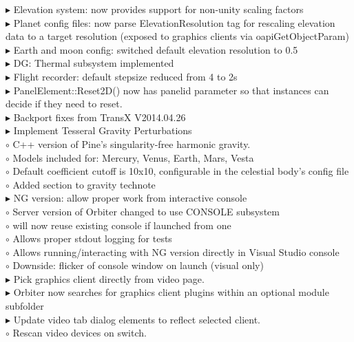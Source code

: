 \documentclass[Orbiter User Manual.tex]{subfiles}
\begin{document}
\begin{sloppypar}
$\blacktriangleright$ Elevation system: now provides support for non-unity scaling factors\\
$\blacktriangleright$ Planet config files: now parse ElevationResolution tag for rescaling elevation data to a target resolution (exposed to graphics clients via oapiGetObjectParam)\\
$\blacktriangleright$ Earth and moon config: switched default elevation resolution to 0.5\\
$\blacktriangleright$ DG: Thermal subsystem implemented\\
$\blacktriangleright$ Flight recorder: default stepsize reduced from 4 to 2s\\
$\blacktriangleright$ PanelElement::Reset2D() now has panelid parameter so that instances can decide if they need to reset.\\
$\blacktriangleright$ Backport fixes from TransX V2014.04.26\\
$\blacktriangleright$ Implement Tesseral Gravity Perturbations\\
$\circ$ C++ version of Pine's singularity-free harmonic gravity.\\
$\circ$ Models included for: Mercury, Venus, Earth, Mars, Vesta\\
$\circ$ Default coefficient cutoff is 10x10, configurable in the celestial body's config file\\
$\circ$ Added section to gravity technote\\
$\blacktriangleright$ NG version: allow proper work from interactive console\\
$\circ$ Server version of Orbiter changed to use CONSOLE subsystem\\
$\circ$ will now reuse existing console if launched from one\\
$\circ$ Allows proper stdout logging for tests\\
$\circ$ Allows running/interacting with NG version directly in Visual Studio console\\
$\circ$ Downside: flicker of console window on launch (visual only)\\
$\blacktriangleright$ Pick graphics client directly from video page.\\
$\blacktriangleright$ Orbiter now searches for graphics client plugins within an optional module subfolder\\
$\blacktriangleright$ Update video tab dialog elements to reflect selected client.\\
$\circ$ Rescan video devices on switch.\\

\end{sloppypar}
\end{document}
